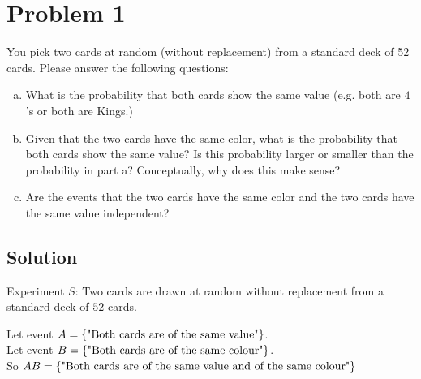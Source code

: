\section{Problem 1}
 
 You pick two cards at random (without replacement) from a standard deck of 52 cards. Please answer the following questions:
 \begin{enumerate}[a.]
 	\item What is the probability that both cards show the same value (e.g. both are $4$'s or both are Kings.)
 	\item Given that the two cards have the same color, what is the probability that both cards show the same value? Is this probability larger or smaller than the probability in part a? Conceptually, why does this make sense?
 	\item Are the events that the two cards have the same color and the two cards have the same value independent?
 \end{enumerate}
 

\subsection{Solution}

Experiment $S$: Two cards are drawn at random without replacement from a standard deck of $52$ cards.

\noindent Let event $A = \{\text{"Both cards are of the same value"}\}$.\\
\quad Let event $B = \{\text{"Both cards are of the same colour"}\}$.\\
\quad So $AB = \{\text{"Both cards are of the same value and of the same colour"}\}$ 

